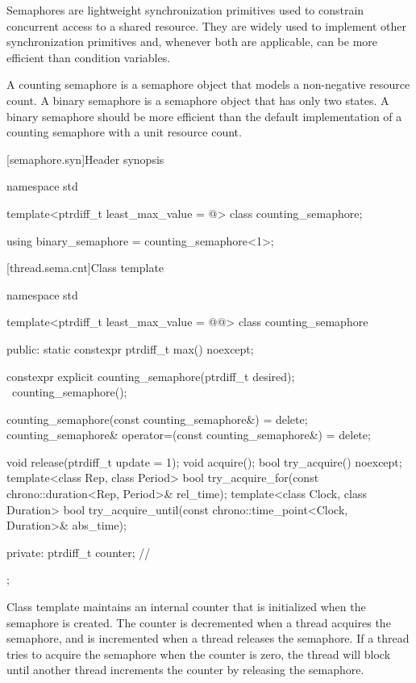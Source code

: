 \pnum
Semaphores are lightweight synchronization primitives
used to constrain concurrent access to a shared resource.
They are widely used to implement other synchronization primitives and,
whenever both are applicable, can be more efficient than condition variables.

\pnum
A counting semaphore is a semaphore object
that models a non-negative resource count.
A binary semaphore is a semaphore object that has only two states.
A binary semaphore should be more efficient than
the default implementation of a counting semaphore with a unit resource count.

[semaphore.syn]{Header  synopsis}

%
\begin{codeblock}
namespace std {
  template<ptrdiff_t least_max_value = @\impdef@>
    class counting_semaphore;

  using binary_semaphore = counting_semaphore<1>;
}
\end{codeblock}

[thread.sema.cnt]{Class template }

\begin{codeblock}
namespace std {
  template<ptrdiff_t least_max_value = @\textit{}@>
  class counting_semaphore {
  public:
    static constexpr ptrdiff_t max() noexcept;

    constexpr explicit counting_semaphore(ptrdiff_t desired);
    ~counting_semaphore();

    counting_semaphore(const counting_semaphore&) = delete;
    counting_semaphore& operator=(const counting_semaphore&) = delete;

    void release(ptrdiff_t update = 1);
    void acquire();
    bool try_acquire() noexcept;
    template<class Rep, class Period>
      bool try_acquire_for(const chrono::duration<Rep, Period>& rel_time);
    template<class Clock, class Duration>
      bool try_acquire_until(const chrono::time_point<Clock, Duration>& abs_time);

  private:
    ptrdiff_t counter;          // \expos
  };
}
\end{codeblock}

\pnum
{}%
Class template  maintains an internal counter
that is initialized when the semaphore is created.
The counter is decremented when a thread acquires the semaphore, and
is incremented when a thread releases the semaphore.
If a thread tries to acquire the semaphore when the counter is zero,
the thread will block
until another thread increments the counter by releasing the semaphore.

